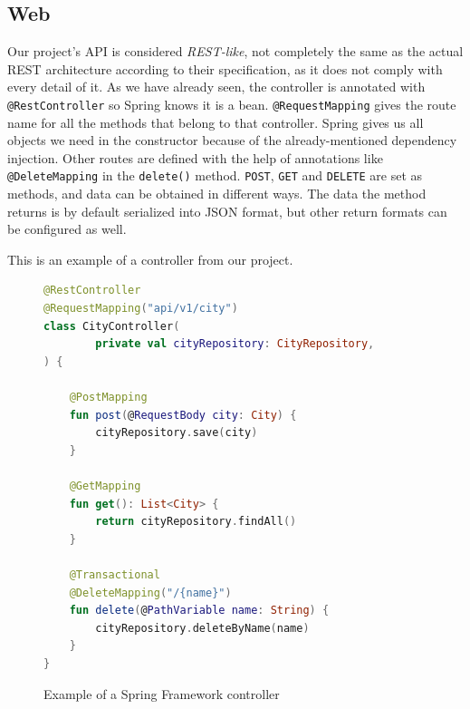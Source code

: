 \subsection{Web}\label{subsec:web}

Our project's API is considered \emph{REST-like}, not completely the same as the actual REST architecture according to their specification, as it
does not comply with every detail of it. As we have already seen, the controller is annotated with \texttt{@RestController} so Spring knows it is a
bean. \texttt{@RequestMapping} gives the route name for all the methods that belong to that controller. Spring gives us all objects we need in
the constructor because of the already-mentioned dependency injection. Other routes are defined with the help of annotations like
\texttt{@DeleteMapping} in the \texttt{delete()} method. \texttt{POST}, \texttt{GET} and \texttt{DELETE} are set as methods, and data can be
obtained in different ways. The data the method returns is by default serialized into JSON format, but other return formats can be configured
as well.

\clearpage

This is an example of a controller from our project.

\begin{figure}[hbt!]
    \begin{center}
        \begin{lstlisting}[language=Kotlin,label={lst:spring-code-4},belowskip=-1 \baselineskip]
@RestController
@RequestMapping("api/v1/city")
class CityController(
        private val cityRepository: CityRepository,
) {

    @PostMapping
    fun post(@RequestBody city: City) {
        cityRepository.save(city)
    }

    @GetMapping
    fun get(): List<City> {
        return cityRepository.findAll()
    }

    @Transactional
    @DeleteMapping("/{name}")
    fun delete(@PathVariable name: String) {
        cityRepository.deleteByName(name)
    }
}
        \end{lstlisting}
    \end{center}
    \caption{Example of a Spring Framework controller}
    \label{fig:figure4.10}
\end{figure}

